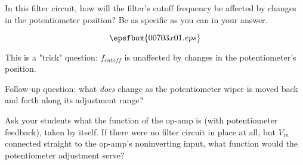 

In this filter circuit, how will the filter's cutoff frequency be affected by changes in the potentiometer position?  Be as specific as you can in your answer.

$$\epsfbox{00703x01.eps}$$







This is a "trick" question: $f_{cutoff}$ is unaffected by changes in the potentiometer's position.

\vskip 10pt

Follow-up question: what {\it does} change as the potentiometer wiper is moved back and forth along its adjustment range?







Ask your students what the function of the op-amp is (with potentiometer feedback), taken by itself.  If there were no filter circuit in place at all, but $V_{in}$ connected straight to the op-amp's noninverting input, what function would the potentiometer adjustment serve?




